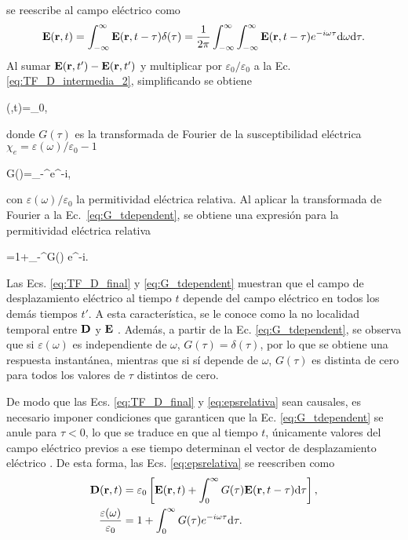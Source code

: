se reescribe al campo eléctrico como
\begin{equation}
	\vb{E}(\vb{r},t)=\int_{-\infty}^{\infty}\vb{E}(\vb{r},t-\tau)\delta(\tau)=\frac{1}{2\pi}\int_{-\infty}^{\infty}\int_{-\infty}^{\infty}\vb{E}(\vb{r},t-\tau)e^{-i\omega\tau}\text{d}\omega\text{d}\tau.
\end{equation}
%
Al sumar $\vb{E}(\vb{r},t')-\vb{E}(\vb{r},t')$ y multiplicar por $\varepsilon_0/\varepsilon_0$ a la Ec. \eqref{eq:TF_D_intermedia_2}, simplificando se obtiene
%
\begin{tcolorbox}
	(,t)=\varepsilon_0,\label{eq:TF_D_final} 
\end{tcolorbox}
%
\noindent donde $G(\tau)$ es la transformada de Fourier de la susceptibilidad eléctrica $\chi_e=\varepsilon(\omega)/\varepsilon_0-1$ \cite{jacksonClassicalElectrodynamics2021a}
%
\begin{tcolorbox}
	G(\tau)=\int_{-\infty}^{\infty}e^{-i\omega\tau}\omega,
	\label{eq:G_tdependent} 
\end{tcolorbox}
%
\noindent con $\varepsilon(\omega)/\varepsilon_0$ la permitividad eléctrica relativa. Al aplicar la transformada de Fourier a la Ec.~\eqref{eq:G_tdependent}, se obtiene una expresión para la permitividad eléctrica relativa
%
\begin{tcolorbox}
	=1+\int_{-\infty}^{\infty}G(\tau) e^{-i\omega\tau}\tau.
	\label{eq:epsrelativa} 
\end{tcolorbox}
%

\noindent Las Ecs. \eqref{eq:TF_D_final} y \eqref{eq:G_tdependent} muestran que el campo de desplazamiento eléctrico al tiempo $t$ depende del campo eléctrico en todos los demás tiempos $t'$. A esta característica, se le conoce como la no localidad temporal entre $\vb{D}$ y $\vb{E}$ \cite{jacksonClassicalElectrodynamics2021a}. Además, a partir de la Ec. \eqref{eq:G_tdependent}, se observa que si $\varepsilon(\omega)$ es independiente de $\omega$, $G(\tau)=\delta(\tau)$, por lo que se obtiene una respuesta instantánea, mientras que si sí depende de $\omega$, $G(\tau)$ es distinta de cero para todos los valores de $\tau$ distintos de cero.


De modo que las Ecs. \eqref{eq:TF_D_final} y \eqref{eq:epsrelativa} sean causales, es necesario imponer condiciones que garanticen que la Ec. \eqref{eq:G_tdependent} se anule para $\tau<0$, lo que se traduce en que al tiempo $t$, únicamente valores del campo eléctrico previos a ese tiempo determinan el vector de desplazamiento eléctrico \cite{jacksonClassicalElectrodynamics2021a}. De esta forma, las Ecs. \eqref{eq:epsrelativa} se reescriben como
%
\begin{align*}
	\vb{D}(\vb{r},t)&=\varepsilon_0\left[\vb{E}(\vb{r},t)+\int_{0}^{\infty}G(\tau)\vb{E}(\vb{r},t-\tau)\text{d}\tau\right],\\ \label{eq:TF_D_final}
	\frac{\varepsilon(\omega)}{\varepsilon_0}&=1+\int_{0}^{\infty}G(\tau) e^{-i\omega\tau}\text{d}\tau.
\end{align*}
%

